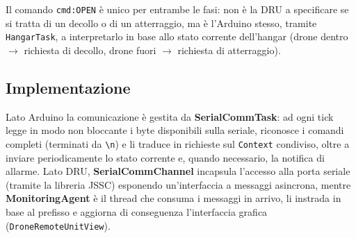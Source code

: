 \documentclass[a4paper,12pt]{report}
\begin{document}
Il comando \texttt{cmd:OPEN} è unico per entrambe le fasi: non è la DRU a
specificare se si tratta di un decollo o di un atterraggio, ma è l'Arduino
stesso, tramite \texttt{HangarTask}, a interpretarlo in base allo stato
corrente dell'hangar (drone dentro $\rightarrow$ richiesta di decollo, drone
fuori $\rightarrow$ richiesta di atterraggio).

\subsection{Implementazione}

Lato Arduino la comunicazione è gestita da \textbf{SerialCommTask}: ad ogni
tick legge in modo non bloccante i byte disponibili sulla seriale,
riconosce i comandi completi (terminati da \texttt{\textbackslash n}) e li
traduce in richieste sul \texttt{Context} condiviso, oltre a inviare
periodicamente lo stato corrente e, quando necessario, la notifica di
allarme. Lato DRU, \textbf{SerialCommChannel} incapsula l'accesso alla porta
seriale (tramite la libreria JSSC) esponendo un'interfaccia a messaggi
asincrona, mentre \textbf{MonitoringAgent} è il thread che consuma i
messaggi in arrivo, li instrada in base al prefisso e aggiorna di
conseguenza l'interfaccia grafica (\texttt{DroneRemoteUnitView}).
\end{document}
